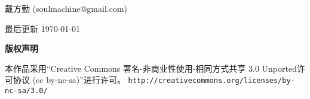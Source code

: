 \thispagestyle{plain}
\begin{center}
  {\LARGE\textbf{\BookTitle}}

  \vspace{1em}
  {\large 戴方勤 (soulmachine@gmail.com)}

  \vspace{1ex}
  
  \vspace{1ex}
  最后更新 \today
  
  \vspace{1em}
  \textbf{\large 版权声明}
\end{center}
\noindent 本作品采用“Creative Commons 署名-非商业性使用-相同方式共享 3.0 Unported许可协议 
(cc by-nc-sa)”进行许可。
\texttt{\small http://creativecommons.org/licenses/by-nc-sa/3.0/}

\vspace{1em}
